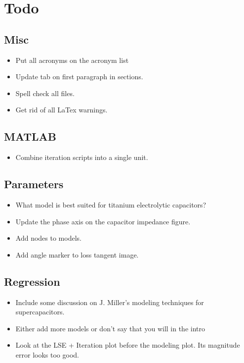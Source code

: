 \section{Todo}

\subsection{Misc}
\begin{itemize}
    \item Put all acronyms on the acronym list
    \item Update tab on first paragraph in sections.
    \item Spell check all files.
    \item Get rid of all LaTex warnings.
\end{itemize}

\subsection{MATLAB}
\begin{itemize}
    \item Combine iteration scripts into a single unit.
\end{itemize}

\subsection{Parameters}
\begin{itemize}
    \item What model is best suited for titanium electrolytic capacitors?
    \item Update the phase axis on the capacitor impedance figure.
    \item Add nodes to models.
    \item Add angle marker to loss tangent image.
\end{itemize}

\subsection{Regression}
\begin{itemize}
    \item Include some discussion on J. Miller's modeling techniques for supercapacitors.
    \item Either add more models or don't say that you will in the intro
    \item Look at the LSE + Iteration plot before the modeling plot. Its magnitude error looks too good.
\end{itemize}

